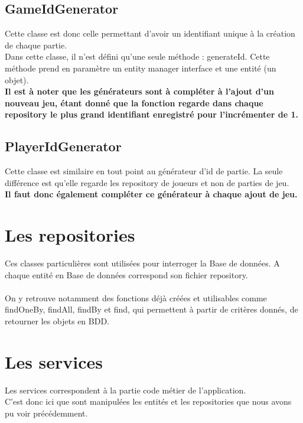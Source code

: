 \documentclass{article}
\begin{document}
        \subsection{GameIdGenerator}
            Cette classe est donc celle permettant d'avoir un identifiant unique à la création de chaque partie.\\
            \indent Dans cette classe, il n'est défini qu'une seule méthode : generateId. Cette méthode prend en paramètre un entity manager interface et une entité (un objet).\\
            \indent \textbf{Il est à noter que les générateurs sont à compléter à l'ajout d'un nouveau jeu, étant donné que la fonction regarde dans chaque repository le plus grand identifiant enregistré pour l'incrémenter de 1.}

        \subsection{PlayerIdGenerator}
            Cette classe est similaire en tout point au générateur d'id de partie. La seule différence est qu'elle regarde les repository de joueurs et non de parties de jeu.\\
            \indent \textbf{Il faut donc également compléter ce générateur à chaque ajout de jeu.}

    \section{Les repositories}

        Ces classes particulières sont utilisées pour interroger la Base de données. A chaque entité en Base de données correspond son fichier repository.\\
        \\
        \indent On y retrouve notamment des fonctions déjà créées et utilisables comme findOneBy, findAll, findBy et find, qui permettent à partir de critères donnés, de retourner les objets en BDD.


    \newpage
    \section{Les services}

        Les services correspondent à la partie code métier de l'application.\\
        \indent C'est donc ici que sont manipulées les entités et les repositories que nous avons pu voir précédemment.
\end{document}
